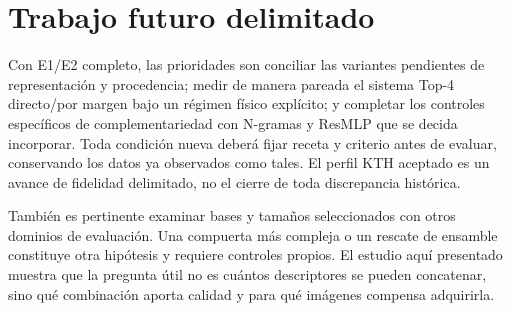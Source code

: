 \section{Trabajo futuro delimitado}
Con E1/E2 completo, las prioridades son conciliar las variantes pendientes de representación y procedencia; medir de manera pareada el sistema Top-4 directo/por margen bajo un régimen físico explícito; y completar los controles específicos de complementariedad con N-gramas y ResMLP que se decida incorporar. Toda condición nueva deberá fijar receta y criterio antes de evaluar, conservando los datos ya observados como tales. El perfil KTH aceptado es un avance de fidelidad delimitado, no el cierre de toda discrepancia histórica.

También es pertinente examinar bases y tamaños seleccionados con otros dominios de evaluación. Una compuerta más compleja o un rescate de ensamble constituye otra hipótesis y requiere controles propios. El estudio aquí presentado muestra que la pregunta útil no es cuántos descriptores se pueden concatenar, sino qué combinación aporta calidad y para qué imágenes compensa adquirirla.

